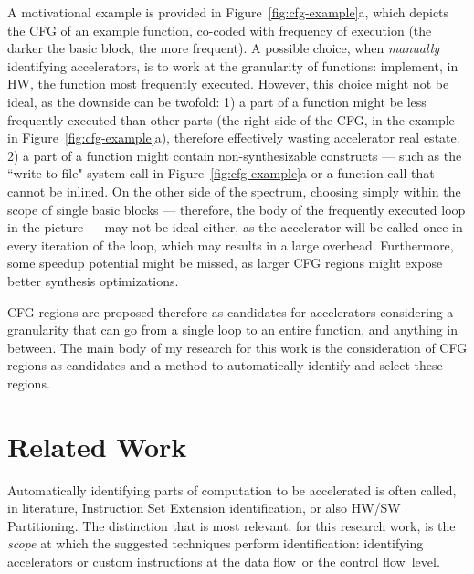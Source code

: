 \documentclass[]{usiinfthesis}
\newcommand{\dataflow}{data flow}
\newcommand{\controlflow}{control flow}
\begin{document}
A motivational example is provided in Figure~\ref{fig:cfg-example}a,
which depicts the CFG of an example function, co-coded with
frequency of execution (the darker the basic block, the more
frequent). A possible choice, when \emph{manually} identifying
accelerators, is to work at the granularity of functions: implement,
in HW, the function most frequently executed. However, this choice
might not be ideal, as the downside can be twofold: 1) a part of a
function might be less frequently executed than other parts (the right
side of the CFG, in the example in Figure~\ref{fig:cfg-example}a),
therefore effectively wasting accelerator real estate. 2) a part of a
function might contain non-synthesizable constructs --- such as the
``write to file" system call in Figure~\ref{fig:cfg-example}a or a function 
call that cannot be inlined.  On the
other side of the spectrum, choosing simply within the scope of single
basic blocks --- therefore, the body of the frequently executed loop
in the picture --- may not be ideal either, as the accelerator will be
called once in every iteration of the loop, which may results in a
large overhead. Furthermore, some speedup potential might be missed,
as larger CFG regions might expose better synthesis optimizations.\par

CFG regions are proposed therefore as candidates for
accelerators considering a granularity that can go from a
single loop to an entire function, and anything in between. 
The main body of my research for this work is the consideration 
of CFG regions as candidates and a method to 
automatically identify and select these regions.

\section{Related Work}
\label{sec:rw}

Automatically identifying parts of computation to be
accelerated is often called, in literature, Instruction Set Extension
identification, or also HW/SW Partitioning. The distinction that is most 
relevant, for this research work, is the
\emph{scope} at which the suggested techniques perform identification: 
identifying accelerators or custom instructions at the \dataflow\ or
the \controlflow\ level.\par
\end{document}

